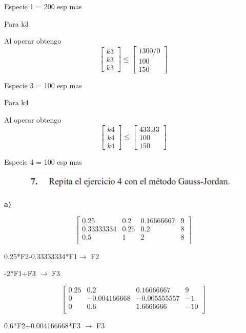 \documentclass[12pt]{article}
\begin{document}
Especie 1 = 200 esp mas

Para k3 

Al operar obtengo
\[
\begin{bmatrix}
k3 \\
k3 \\
k3
\end{bmatrix} \leq 
\begin{bmatrix}
1300/0\\
100\\
150
\end{bmatrix}
\] 

Especie 3 = 100 esp mas

Para k4

Al operar obtengo
\[
\begin{bmatrix}
k4 \\
k4 \\
k4
\end{bmatrix} \leq 
\begin{bmatrix}
433.33\\
100\\
150
\end{bmatrix}
\] 

Especie 4 = 100 esp mas

\begin{figure}[H]
\includegraphics[width=1\textwidth]{./inFiles/Figures/Ej7.png}
\end{figure}


\textbf{a)}

\[
\begin{bmatrix}
0.25 & 0.2 & 0.16666667 & 9 \\
0.33333334 & 0.25 & 0.2 & 8 \\
0.5 & 1 & 2 & 8 \\
\end{bmatrix}
\]

0.25*F2-0.33333334*F1$\longrightarrow $ F2

-2*F1+F3 $\longrightarrow $ F3

\[
\begin{bmatrix}
0.25 & 0.2 & 0.16666667 & 9 \\
0 & -0.004166668 & -0.005555557 & -1 \\
0 & 0.6 & 1.6666666 & -10 \\
\end{bmatrix}
\]

0.6*F2+0.004166668*F3 $\longrightarrow $ F3
\end{document}
